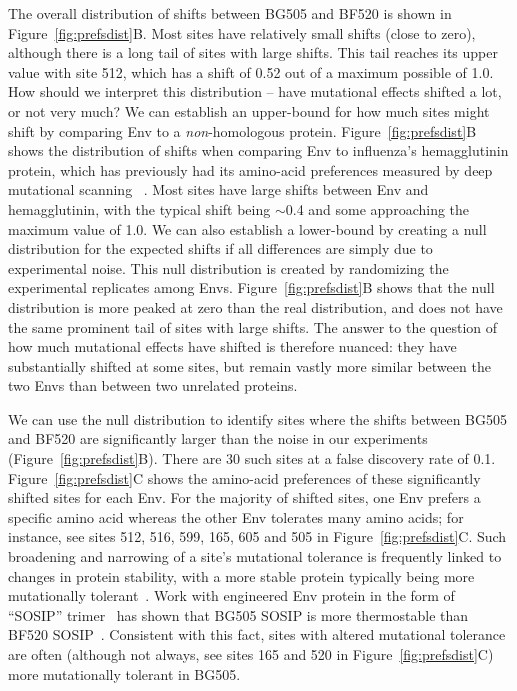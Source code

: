 \documentclass[9pt]{elife}
\begin{document}
The overall distribution of shifts between BG505 and BF520 is shown in Figure~\ref{fig:prefsdist}B.
Most sites have relatively small shifts (close to zero), although there is a long tail of sites with large shifts.
This tail reaches its upper value with site 512, which has a shift of 0.52 out of a maximum possible of 1.0.
How should we interpret this distribution -- have mutational effects shifted a lot, or not very much?
We can establish an upper-bound for how much sites might shift by comparing Env to a \emph{non}-homologous protein.
Figure~\ref{fig:prefsdist}B shows the distribution of shifts when comparing Env to influenza's hemagglutinin protein, which has previously had its amino-acid preferences measured by deep mutational scanning~\citep{doud2016accurate} .
Most sites have large shifts between Env and hemagglutinin, with the typical shift being $\sim$0.4 and some approaching the maximum value of 1.0.
We can also establish a lower-bound by creating a null distribution for the expected shifts if all differences are simply due to experimental noise.
This null distribution is created by randomizing the experimental replicates among Envs.
Figure~\ref{fig:prefsdist}B shows that the null distribution is more peaked at zero than the real distribution, and does not have the same prominent tail of sites with large shifts.
The answer to the question of how much mutational effects have shifted is therefore nuanced: they have substantially shifted at some sites, but remain vastly more similar between the two Envs than between two unrelated proteins. 

We can use the null distribution to identify sites where the shifts between BG505 and BF520 are significantly larger than the noise in our experiments (Figure~\ref{fig:prefsdist}B).
There are 30 such sites at a false discovery rate of 0.1.
Figure~\ref{fig:prefsdist}C shows the amino-acid preferences of these significantly shifted sites for each Env.
For the majority of shifted sites, one Env prefers a specific amino acid whereas the other Env tolerates many amino acids; for instance, see sites 512, 516, 599, 165, 605 and 505 in Figure~\ref{fig:prefsdist}C.
Such broadening and narrowing of a site's mutational tolerance is frequently linked to changes in protein stability, with a more stable protein typically being more mutationally tolerant~\citep{wang2002evolution,bloom2006protein,gong2013stability,kumar2017stability}.
Work with engineered Env protein in the form of ``SOSIP'' trimer~\citep{binley2000recombinant,sanders2002stabilization} has shown that BG505 SOSIP is more thermostable than BF520 SOSIP~\citep{verkerke2016epitope}.
Consistent with this fact, sites with altered mutational tolerance are often (although not always, see sites 165 and 520 in Figure~\ref{fig:prefsdist}C) more mutationally tolerant in BG505.
\end{document}
